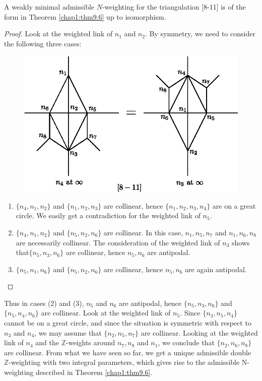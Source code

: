\begin{lemma}\label{chap1:lem9.18}
A weakly minimal admissible $N$-weighting for the triangulation [8-11]
is of the form in Theorem \ref{chap1:thm9.6} up to isomorphism.  
\end{lemma}

\begin{proof}
Look at the weighted link of $n_1$ and $n_2$. By symmetry, we need to
consider the following three cases: 
\begin{figure}[H]
\centering 
\includegraphics{vol58-fig/fig58-53.eps} 
\end{figure}
\begin{enumerate}
\item $\{ n_4, n_1, n_2 \}$ and $\{ n_1, n_2, n_3 \}$ are collinear,
  hence $\{ n_1, n_2, n_3 , n_4 \}$ are on a great circle. We easily
  get a contradiction for the weighted link of $n_5$. 

\item $\{ n_4, n_1, n_2 \}$ and $\{ n_5, n_2, n_6 \}$ are collinear.
  In this case,  $n_1, n_5, n_7$ and $n_1, n_6, n_8$ are necessarily
  collinear.  The consideration of the weighted link of $n_3$ shows
  that\pageoriginale $\{ n_5, n_3, n_6 \}$  are collinear,   hence
  $n_5, n_6$ are antipodal.  

\item $\{ n_5, n_1, n_6 \}$ and $\{ n_5, n_2, n_6 \}$ are collinear,
  hence $n_5, n_6$ are again antipodal. 
\end{enumerate}
\end{proof}

Thus in cases (2) and (3), $n_5$ and $n_6$ are antipodal, hence
$\{ n_5, n_3, n_6 \}$ and $\{ n_5, n_4, n_6 \}$ are collinear.  Look
at the weighted link of $n_5$. Since $\{ n_3, n_5, n_4 \}$ cannot be
on a great circle,  and since the situation is symmetric with respect
to $n_3$ and $n_4$, we may assume that $\{ n_2, n_5, n_7 \}$ are
collinear. Looking at the weighted link of $n_4$ and the
$\mathbb{Z}$-weights around $n_7, n_8$ and $n_1$, we conclude that $\{
n_2, n_6, n_8 \}$ are collinear.  From what we have seen so far,  we
get a unique admissible double $\mathbb{Z}$-weighting with two
integral parameters, which gives rise to the admissible N-weighting
described in Theorem \ref{chap1:thm9.6}. 

